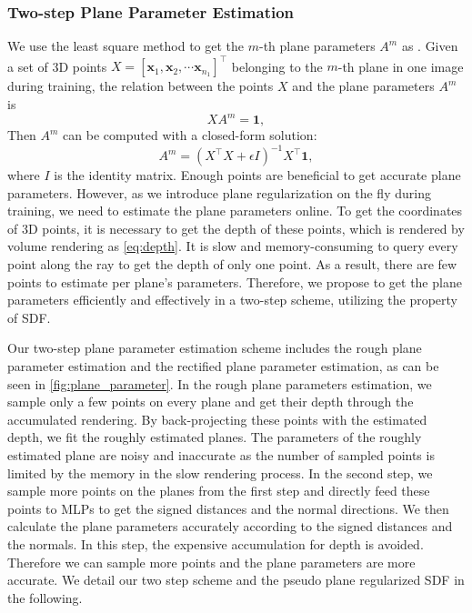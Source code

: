\documentclass[10pt,journal,compsoc]{IEEEtran}
\begin{document}
	\subsubsection{Two-step Plane Parameter Estimation}
	\label{sec:plane}
	We use the least square method to get the $m$-th plane parameters $A^m$ as \cite{yu2020p}. Given a set of 3D points $X=[\bm{x}_1, \bm{x}_2, \cdots \bm{x}_{n_1}]^\top$ belonging to the $m$-th plane in one image during training, the relation between the points $X$ and the plane parameters $A^m$ is
	\begin{equation}
		XA^m=\bm{1},
	\end{equation}
	Then $A^m$ can be computed with a closed-form solution:
	\begin{equation}
		A^m=\left(X^{\top} X+\epsilon I\right)^{-1} X^{\top} \bm{1},
		\label{eq:plane}
	\end{equation}
	where $I$ is the identity matrix.
	Enough points are beneficial to get accurate plane parameters. However, as we introduce plane regularization on the fly during training, we need to estimate the plane parameters online. To get the coordinates of 3D points, it is necessary to get the depth of these points, which is rendered by volume rendering as \cref{eq:depth}. It is slow and memory-consuming to query every point along the ray to get the depth of only one point. As a result, there are few points to estimate per plane's parameters. Therefore, we propose to get the plane parameters efficiently and effectively in a two-step scheme, utilizing the property of SDF. 
	
	Our two-step plane parameter estimation scheme includes the rough plane parameter estimation and the rectified plane parameter estimation, as can be seen in \cref{fig:plane_parameter}. 
	In the rough plane parameters estimation, we sample only a few points on every plane and get their depth through the accumulated rendering. By back-projecting these points with the estimated depth, we fit the roughly estimated planes. The parameters of the roughly estimated plane are noisy and inaccurate as the number of sampled points is limited by the memory in the slow rendering process. In the second step, we sample more points on the planes from the first step and directly feed these points to MLPs to get the signed distances and the normal directions. We then calculate the plane parameters accurately according to the signed distances and the normals. In this step, the expensive accumulation for depth is avoided. Therefore we can sample more points and the plane parameters are more accurate. We detail our two step scheme and the pseudo plane regularized SDF in the following.\\
	
\end{document}
